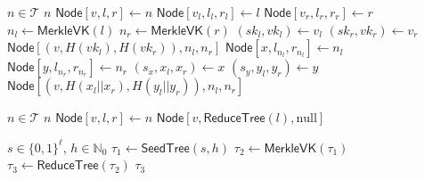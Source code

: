 \documentclass{article}
\begin{document}
\begin{algorithm}
\caption{$\mathsf{MerkleVK}: n \to \mathsf{\hyperref[def:Node]{Node}}  $}\label{alg:MerkleVK}
\begin{algorithmic}[1]
\Require $n\in \mathcal{T}$
    \State \Return $n$
\Else
    \State $\mathsf{\hyperref[def:Node]{Node}}[v,l,r] \gets n$
    \State $\mathsf{\hyperref[def:Node]{Node}}[v_l,l_l,r_l] \gets l$
    \State $\mathsf{\hyperref[def:Node]{Node}}[v_r,l_r,r_r] \gets r$
    \State $n_{l}\gets \mathsf{\hyperref[alg:MerkleVK]{MerkleVK}}(l)$ 
    \State $n_{r}\gets \mathsf{\hyperref[alg:MerkleVK]{MerkleVK}}(r)$ 
        \State $(sk_l,vk_l)\gets v_l$
        \State $(sk_r,vk_r)\gets v_r$
        \State \Return $\mathsf{\hyperref[def:Node]{Node}}[(v,H(vk_l),H(vk_r)),n_l,n_r]$
    \Else
        \State $\mathsf{\hyperref[def:Node]{Node}}[x,l_{n_l},r_{n_l}] \gets n_l$
        \State $\mathsf{\hyperref[def:Node]{Node}}[y,l_{n_r},r_{n_r}] \gets n_r$
        \State $(s_{x},x_{l},x_{r})\gets x$
        \State $(s_{y},y_{l},y_{r})\gets y$
        \State \Return $\mathsf{\hyperref[def:Node]{Node}}[(v,H(x_{l}||x_{r}),H(y_{l}||y_{r})),n_l,n_r]$
    \EndIf
\EndIf
\end{algorithmic}
\end{algorithm}

\begin{algorithm}
\caption{$\mathsf{ReduceTree}: n \to \mathsf{\hyperref[def:Node]{Node}}  $}\label{alg:ReduceTree}
\begin{algorithmic}[1]
\Require $n\in \mathcal{T}$
    \State \Return $n$
\Else
    \State $\mathsf{\hyperref[def:Node]{Node}}[v,l,r] \gets n$
    \State \Return $\mathsf{\hyperref[def:Node]{Node}}[v,\mathsf{\hyperref[alg:ReduceTree]{ReduceTree}}(l),\mathrm{null}]$
\EndIf
\end{algorithmic}
\end{algorithm}

\begin{algorithm}
\caption{$\mathsf{KeyGenSum}: s,h \to \mathsf{\hyperref[def:Node]{Node}}  $}\label{alg:KeyGenSum}
\begin{algorithmic}[1]
\Require $s \in \{0,1\}^\ell$, $h\in \mathbb{N}_0$
\State $\tau_1 \gets \mathsf{\hyperref[alg:SeedTree]{SeedTree}}(s,h)$
\State $\tau_2 \gets \mathsf{\hyperref[alg:MerkleVK]{MerkleVK}}(\tau_1)$
\State $\tau_3 \gets \mathsf{\hyperref[alg:ReduceTree]{ReduceTree}}(\tau_2)$
\State \Return $\tau_3$
\end{algorithmic}
\end{algorithm}
\end{document}
